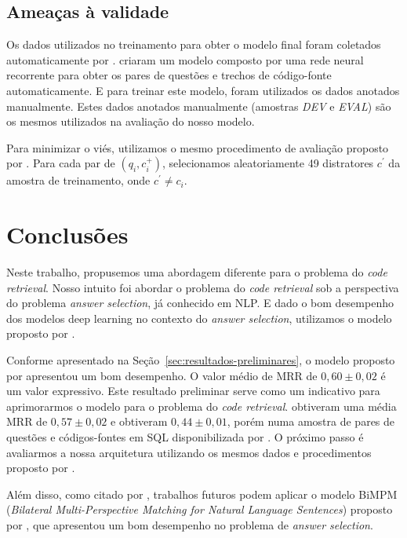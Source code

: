 \documentclass[12pt]{article}
\begin{document}
\subsection{Ameaças à validade}

Os dados utilizados no treinamento para obter o modelo final foram coletados automaticamente por \cite{Yao-staqc:2018}. \cite{Yao-staqc:2018} criaram um modelo composto por uma rede neural recorrente para obter os pares de questões e trechos de código-fonte automaticamente. E para treinar este modelo, foram utilizados os dados anotados manualmente. Estes dados anotados manualmente (amostras \emph{DEV} e \emph{EVAL}) são os mesmos utilizados na avaliação do nosso modelo. 

Para minimizar o viés, utilizamos o mesmo procedimento de avaliação proposto por \cite{iyer-etal-2016-summarizing}. Para cada par de $(q_{i}, c_{i}^{+})$, selecionamos aleatoriamente 49 distratores $c^{'}$ da amostra de treinamento, onde $c^{'} \neq c_{i}$. 

\section{Conclusões}\label{sec:conclusao}

Neste trabalho, propusemos uma abordagem diferente para o problema do \textit{code retrieval}. Nosso intuito foi abordar o problema do \textit{code retrieval} sob a perspectiva do problema \textit{answer selection}, já conhecido em NLP. E dado o bom desempenho dos modelos deep learning no contexto do \textit{answer selection}, utilizamos o modelo proposto por \cite{tan-lstm-qa}.

Conforme apresentado na Seção~\ref{sec:resultados-preliminares}, o modelo proposto por \cite{tan-lstm-qa} apresentou um bom desempenho. O valor médio de MRR de $0,60 \pm 0,02$ é um valor expressivo. Este resultado preliminar serve como um indicativo para aprimorarmos o modelo para o problema do \textit{code retrieval}. \cite{Yao-staqc:2018} obtiveram uma média MRR de $0,57 \pm 0,02$ e \cite{iyer-etal-2016-summarizing} obtiveram $0,44 \pm 0,01$, porém numa amostra de pares de questões e códigos-fontes em SQL disponibilizada por \cite{iyer-etal-2016-summarizing}. O próximo passo é avaliarmos a nossa arquitetura utilizando os mesmos dados e procedimentos proposto por \cite{Yao-staqc:2018}. 

Além disso, como citado por \cite{lai-etal-2018-review}, trabalhos futuros podem aplicar o modelo BiMPM (\textit{Bilateral Multi-Perspective Matching for Natural Language Sentences}) proposto por \cite{wang-BiMPM-2017}, que apresentou um bom desempenho no problema de \textit{answer selection}.
\end{document}
